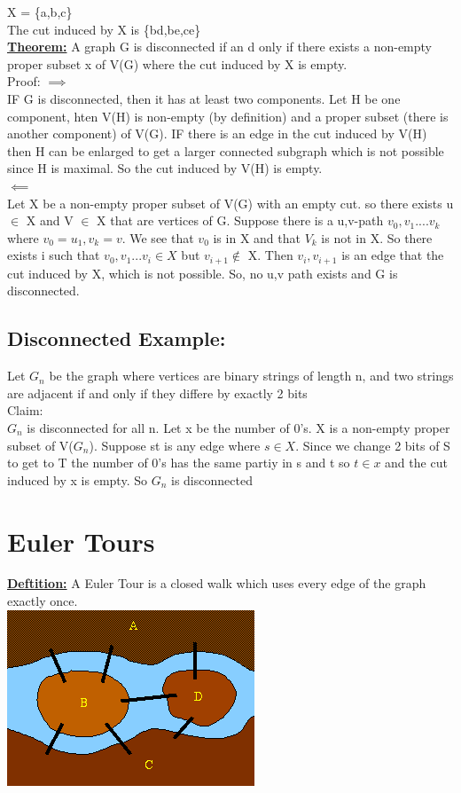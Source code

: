 \documentclass[12pt]{article}
\newcommand{\myt}[1]{\textbf{\underline{#1}}}
\begin{document}
	X = \{a,b,c\}\\
	The cut induced by X is \{bd,be,ce\}\\
	
	\myt{Theorem:} A graph G is disconnected if an d only if there exists a non-empty proper subset x of V(G) where the cut induced by X is empty.\\
	
	Proof: $\implies$\\
	IF G is disconnected, then it has at least two components. Let H be one component, hten V(H) is non-empty (by definition) and a proper subset (there is another component) of V(G). IF there is an edge in the cut induced by V(H) then H can be enlarged to get a larger connected subgraph which is not possible since H is maximal. So the cut induced by V(H) is empty.\\
	
	$\impliedby$\\
	Let X be a non-empty proper subset of V(G) with an empty cut. so there exists u $\in$ X and V $\in$ X that are vertices of G. Suppose there is a u,v-path $v_0,v_1....v_k$ where $v_0 = u_1, v_k = v$. We see that $v_0$ is in X and that $V_k$ is not in X. So there exists i such that $v_0, v_1... v_i \in X$ but $v_{i+1} \notin$ X. Then $v_i, v_{i+1}$ is an edge that the cut induced by X, which is not possible. So, no u,v path exists and G is disconnected.\\
	
	\subsection*{Disconnected Example:}
	Let $G_n$ be the graph where vertices are binary strings of length n, and two strings are adjacent if and only if they differe by exactly 2 bits\\
	
	Claim: \\
	$G_n$ is disconnected for all n. Let x be the number of 0's. X is a non-empty proper subset of V($G_n$). Suppose st is any edge where $s \in X$. Since we change 2 bits of S to get to T the number of 0's has the same partiy in s and t so $t \in x$ and the cut induced by x is empty. So $G_n$ is disconnected\\
	
	\section*{Euler Tours}
	
	\myt{Deftition:} A Euler Tour is a closed walk which uses every edge of the graph exactly once.\\
	
	\includegraphics[scale=0.5]{eulertour.png}
	
	
	
\end{document}
